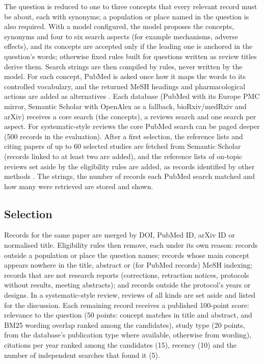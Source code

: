 The question is reduced to one to three concepts that every relevant record must be about, each with synonyms;
a population or place named in the question is also required. With a model configured, the model proposes the
concepts, synonyms and four to six search aspects (for example mechanisms, adverse effects), and its concepts are
accepted only if the leading one is anchored in the question's words; otherwise fixed rules built for questions
written as review titles derive them. Search strings are then compiled by rules, never written by the model. For
each concept, PubMed is asked once how it maps the words to its controlled vocabulary, and the returned MeSH
headings and pharmacological actions are added as alternatives \citep{lefebvre2023searching}. Each database (PubMed
with its Europe PMC mirror, Semantic Scholar with OpenAlex as a fallback, bioRxiv/medRxiv and arXiv) receives a core
search (the concepts), a reviews search and one search per aspect. For systematic-style reviews the core PubMed
search can be paged deeper (500 records in the evaluation). After a first selection, the reference lists and citing
papers of up to 60 selected studies are fetched from Semantic Scholar (records linked to at least two are added),
and the reference lists of on-topic reviews set aside by the eligibility rules are added, as records identified by
other methods \citep{page2021prisma}. The strings, the number of records each PubMed search matched and how many
were retrieved are stored and shown.

\subsection{Selection}

Records for the same paper are merged by DOI, PubMed ID, arXiv ID or normalised title. Eligibility rules then
remove, each under its own reason: records outside a population or place the question names; records whose main
concept appears nowhere in the title, abstract or (for PubMed records) MeSH indexing; records that are not research
reports (corrections, retraction notices, protocols without results, meeting abstracts); and records outside the
protocol's years or designs. In a systematic-style review, reviews of all kinds are set aside and listed for the
discussion. Each remaining record receives a published 100-point score: relevance to the question (50 points:
concept matches in title and abstract, and BM25 wording overlap ranked among the candidates), study type (20 points,
from the database's publication type where available, otherwise from wording), citations per year ranked among the
candidates (15), recency (10) and the number of independent searches that found it (5).

